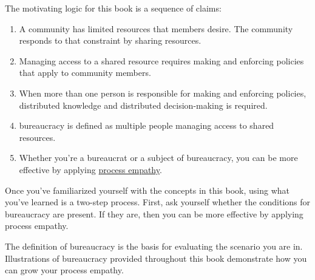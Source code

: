 The motivating logic for this book is a sequence of claims:
\begin{enumerate}
    \item A community has limited resources that members desire. The community responds to that constraint by sharing resources.
    \item Managing access to a \gls{shared resource} 
    \marginpar{[Glossary]}
    requires making and enforcing policies that apply to community members. 
    \item When more than one person is responsible for making and enforcing policies, distributed knowledge and distributed decision-making is required. 
    \item \Gls{bureaucracy} 
    \marginpar{[Glossary]}
    is defined as multiple people managing access to \glspl{shared resource}. 
    \item Whether you're a \gls{bureaucrat} 
    \marginpar{[Glossary]}
    or a subject of bureaucracy, you can be more effective by applying \hyperref[sec:process-empathy]{process empathy}.
\end{enumerate}

Once you've familiarized yourself with the concepts in this book, using what you've learned is a two-step process. First, ask yourself whether the conditions for bureaucracy are present. If they are, then you can be more effective by applying process empathy.

The definition of bureaucracy is the basis for evaluating the scenario you are in. Illustrations of bureaucracy provided throughout this book demonstrate how you can grow your process empathy. 